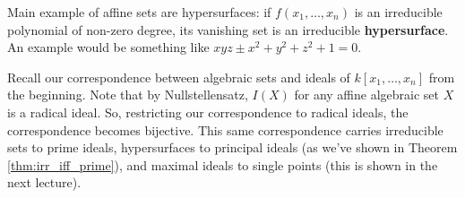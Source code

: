 \documentclass[12pt]{article}
\newcommand{\C}{\mathbb{C}}
\begin{document}
    Main example of affine sets are hypersurfaces: if $f(x_1, \dots, x_n)$ is an irreducible polynomial of non-zero degree, its vanishing set is an irreducible \textbf{hypersurface}. An example would be something like $xyz \pm x^2 + y^2 + z^2 + 1 = 0$. \par 
    Recall our correspondence between algebraic sets and ideals of $k[x_1, \dots, x_n]$ from the beginning. Note that by Nullstellensatz, $I(X)$ for any affine algebraic set $X$ is a radical ideal. So, restricting our correspondence to radical ideals, the correspondence becomes bijective. This same correspondence carries irreducible sets to prime ideals, hypersurfaces to principal ideals (as we've shown in Theorem \ref{thm:irr_iff_prime}), and maximal ideals to single points (this is shown in the next lecture). \par 
\end{document}
